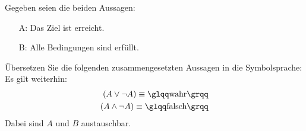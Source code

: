 Gegeben seien die beiden Aussagen: 
\begin{itemize}
	\item[A: ] Das Ziel ist erreicht.
	\item[B: ] Alle Bedingungen sind erfüllt.
\end{itemize}

Übersetzen Sie die folgenden zusammengesetzten Aussagen in die Symbolsprache:\\

Es gilt weiterhin: 
\begin{eqnarray}
	(A \lor \lnot A) \equiv \text{\An{wahr}}\\
	(A \land \lnot A) \equiv \text{\An{falsch}}
\end{eqnarray}
Dabei sind $A$ und $B$ austauschbar.
